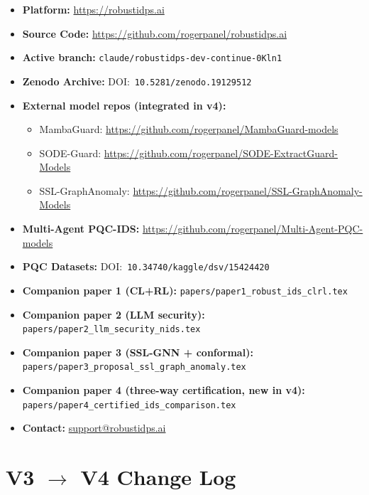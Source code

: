 \documentclass[11pt,a4paper]{article}
\begin{document}
\begin{itemize}
  \item \textbf{Platform:} \url{https://robustidps.ai}
  \item \textbf{Source Code:} \url{https://github.com/rogerpanel/robustidps.ai}
  \item \textbf{Active branch:} \texttt{claude/robustidps-dev-continue-0Kln1}
  \item \textbf{Zenodo Archive:} DOI:~\texttt{10.5281/zenodo.19129512}
  \item \textbf{External model repos (integrated in v4):}
    \begin{itemize}[nosep]
      \item MambaGuard: \url{https://github.com/rogerpanel/MambaGuard-models}
      \item SODE-Guard: \url{https://github.com/rogerpanel/SODE-ExtractGuard-Models}
      \item SSL-GraphAnomaly: \url{https://github.com/rogerpanel/SSL-GraphAnomaly-Models}
    \end{itemize}
  \item \textbf{Multi-Agent PQC-IDS:} \url{https://github.com/rogerpanel/Multi-Agent-PQC-models}
  \item \textbf{PQC Datasets:} DOI:~\texttt{10.34740/kaggle/dsv/15424420}
  \item \textbf{Companion paper 1 (CL+RL):} \texttt{papers/paper1\_robust\_ids\_clrl.tex}
  \item \textbf{Companion paper 2 (LLM security):} \texttt{papers/paper2\_llm\_security\_nids.tex}
  \item \textbf{Companion paper 3 (SSL-GNN + conformal):} \texttt{papers/paper3\_proposal\_ssl\_graph\_anomaly.tex}
  \item \textbf{Companion paper 4 (three-way certification, new in v4):} \texttt{papers/paper4\_certified\_ids\_comparison.tex}
  \item \textbf{Contact:} \href{mailto:support@robustidps.ai}{support@robustidps.ai}
\end{itemize}

\appendix
\section{V3 $\to$ V4 Change Log}
\label{appx:changelog}
\end{document}
